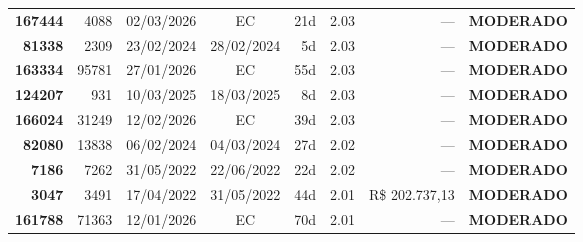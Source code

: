 \documentclass[a4paper,10pt]{article}
\begin{document}
\begin{center}
\begin{longtable}{>{\scriptsize}r>{\scriptsize}r>{\scriptsize}c>{\scriptsize}c>{\scriptsize}r>{\scriptsize}r>{\scriptsize}r>{\scriptsize}l}
\textcolor{anomyellow}{\textbf{167444}} & 4088 & 02/03/2026 & \textcolor{anomorange}{EC} & 21d & \textcolor{anomyellow}{2.03} & --- & \textcolor{anomyellow}{\textbf{MODERADO}} \\

\textcolor{anomyellow}{\textbf{81338}} & 2309 & 23/02/2024 & 28/02/2024 & 5d & \textcolor{anomyellow}{2.03} & --- & \textcolor{anomyellow}{\textbf{MODERADO}} \\

\textcolor{anomyellow}{\textbf{163334}} & 95781 & 27/01/2026 & \textcolor{anomorange}{EC} & 55d & \textcolor{anomyellow}{2.03} & --- & \textcolor{anomyellow}{\textbf{MODERADO}} \\

\textcolor{anomyellow}{\textbf{124207}} & 931 & 10/03/2025 & 18/03/2025 & 8d & \textcolor{anomyellow}{2.03} & --- & \textcolor{anomyellow}{\textbf{MODERADO}} \\

\textcolor{anomyellow}{\textbf{166024}} & 31249 & 12/02/2026 & \textcolor{anomorange}{EC} & 39d & \textcolor{anomyellow}{2.03} & --- & \textcolor{anomyellow}{\textbf{MODERADO}} \\

\textcolor{anomyellow}{\textbf{82080}} & 13838 & 06/02/2024 & 04/03/2024 & 27d & \textcolor{anomyellow}{2.02} & --- & \textcolor{anomyellow}{\textbf{MODERADO}} \\

\textcolor{anomyellow}{\textbf{7186}} & 7262 & 31/05/2022 & 22/06/2022 & 22d & \textcolor{anomyellow}{2.02} & --- & \textcolor{anomyellow}{\textbf{MODERADO}} \\

\textcolor{anomyellow}{\textbf{3047}} & 3491 & 17/04/2022 & 31/05/2022 & 44d & \textcolor{anomyellow}{2.01} & R\$ 202.737,13 & \textcolor{anomyellow}{\textbf{MODERADO}} \\

\textcolor{anomyellow}{\textbf{161788}} & 71363 & 12/01/2026 & \textcolor{anomorange}{EC} & 70d & \textcolor{anomyellow}{2.01} & --- & \textcolor{anomyellow}{\textbf{MODERADO}} \\

\end{longtable}\end{center}
\end{document}
